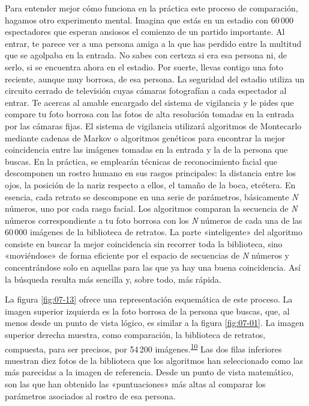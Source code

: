 Para entender mejor cómo funciona en la práctica este proceso de comparación, hagamos otro experimento mental. Imagina que estás en un estadio con 60\,000 espectadores que esperan ansiosos el comienzo de un partido importante. Al entrar, te parece ver a una persona amiga a la que has perdido entre la multitud que se agolpaba en la entrada. No sabes con certeza si era esa persona ni, de serlo, si se encuentra ahora en el estadio. Por suerte, llevas contigo una foto reciente, aunque muy borrosa, de esa persona. La seguridad del estadio utiliza un circuito cerrado de televisión cuyas cámaras fotografían a cada espectador al entrar. Te acercas al amable encargado del sistema de vigilancia y le pides que compare tu foto borrosa con las fotos de alta resolución tomadas en la entrada por las cámaras fijas. El sistema de vigilancia utilizará algoritmos de Montecarlo mediante cadenas de Markov o algoritmos genéticos para encontrar la mejor coincidencia entre las imágenes tomadas en la entrada y la de la persona que buscas. En la práctica, se emplearán técnicas de reconocimiento facial que descomponen un rostro humano en sus rasgos principales: la distancia entre los ojos, la posición de la nariz respecto a ellos, el tamaño de la boca, etcétera. En esencia, cada retrato se descompone en una serie de parámetros, básicamente \emph{N} números, uno por cada rasgo facial. Los algoritmos comparan la secuencia de \emph{N} números correspondiente a tu foto borrosa con los \emph{N} números de cada una de las 60\,000 imágenes de la biblioteca de retratos. La parte «inteligente» del algoritmo consiste en buscar la mejor coincidencia sin recorrer toda la biblioteca, sino «moviéndose» de forma eficiente por el espacio de secuencias de \emph{N} números y concentrándose solo en aquellas para las que ya hay una buena coincidencia. Así la búsqueda resulta más sencilla y, sobre todo, más rápida.

La figura \ref{fig:07-13} ofrece una representación esquemática de este proceso. La imagen superior izquierda es la foto borrosa de la persona que buscas, que, al menos desde un punto de vista lógico, es similar a la figura \ref{fig:07-01}. La imagen superior derecha muestra, como comparación, la biblioteca de retratos, compuesta, para ser precisos, por 54\,200 imágenes.\textsuperscript{\hyperlink{note:07-10}{10}} Las dos filas inferiores muestran diez fotos de la biblioteca que los algoritmos han seleccionado como las más parecidas a la imagen de referencia. Desde un punto de vista matemático, son las que han obtenido las «puntuaciones» más altas al comparar los parámetros asociados al rostro de esa persona.

